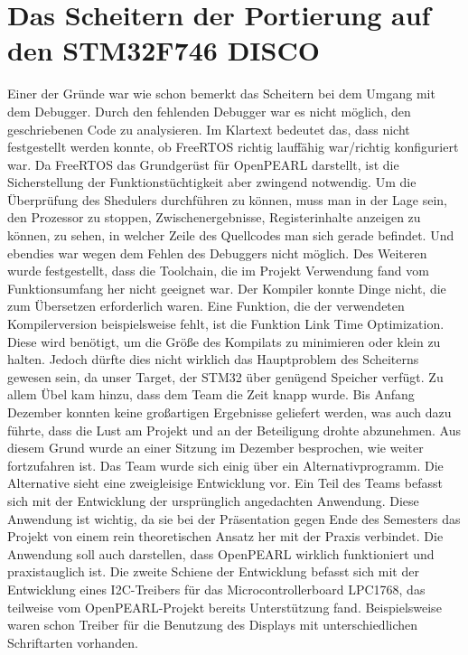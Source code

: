 \chapter{Das Scheitern der Portierung auf den STM32F746 DISCO}
Einer der Gründe war wie schon bemerkt das Scheitern bei dem Umgang mit dem Debugger. Durch den fehlenden Debugger war es nicht möglich, den geschriebenen Code zu analysieren. Im Klartext bedeutet das, dass nicht festgestellt werden konnte, ob FreeRTOS richtig lauffähig war/richtig konfiguriert war. Da FreeRTOS das Grundgerüst für OpenPEARL darstellt, ist die Sicherstellung der Funktionstüchtigkeit aber zwingend notwendig. Um die Überprüfung des Shedulers durchführen zu können, muss man in der Lage sein, den Prozessor zu stoppen, Zwischenergebnisse, Registerinhalte anzeigen zu können, zu sehen, in welcher Zeile des Quellcodes man sich gerade befindet. Und ebendies war wegen dem Fehlen des Debuggers nicht möglich. 
Des Weiteren wurde festgestellt, dass die Toolchain, die im Projekt Verwendung fand vom Funktionsumfang her nicht geeignet war. 
Der Kompiler konnte Dinge nicht, die zum Übersetzen erforderlich waren. Eine Funktion, die der verwendeten Kompilerversion beispielsweise fehlt, ist die Funktion Link Time Optimization. Diese wird benötigt, um die Größe des Kompilats zu minimieren oder klein zu halten. Jedoch dürfte dies nicht wirklich das Hauptproblem des Scheiterns gewesen sein, da unser Target, der STM32 über genügend Speicher verfügt. 
Zu allem Übel kam hinzu, dass dem Team die Zeit knapp wurde. Bis Anfang Dezember konnten keine großartigen Ergebnisse geliefert werden, was auch dazu führte, dass die Lust am Projekt und an der Beteiligung drohte abzunehmen. 
Aus diesem Grund wurde an einer Sitzung im Dezember besprochen, wie weiter fortzufahren ist. Das Team wurde sich einig über ein Alternativprogramm.
Die Alternative sieht eine zweigleisige Entwicklung vor. Ein Teil des Teams befasst sich mit der Entwicklung der ursprünglich angedachten Anwendung. Diese Anwendung ist wichtig, da sie bei der Präsentation gegen Ende des Semesters das Projekt von einem rein theoretischen Ansatz her mit der Praxis verbindet. Die Anwendung soll auch darstellen, dass OpenPEARL wirklich funktioniert und praxistauglich ist. Die zweite Schiene der Entwicklung befasst sich mit der Entwicklung eines I2C-Treibers für das Microcontrollerboard LPC1768, das teilweise vom OpenPEARL-Projekt bereits Unterstützung fand. Beispielsweise waren schon Treiber für die Benutzung des Displays mit unterschiedlichen Schriftarten vorhanden.
